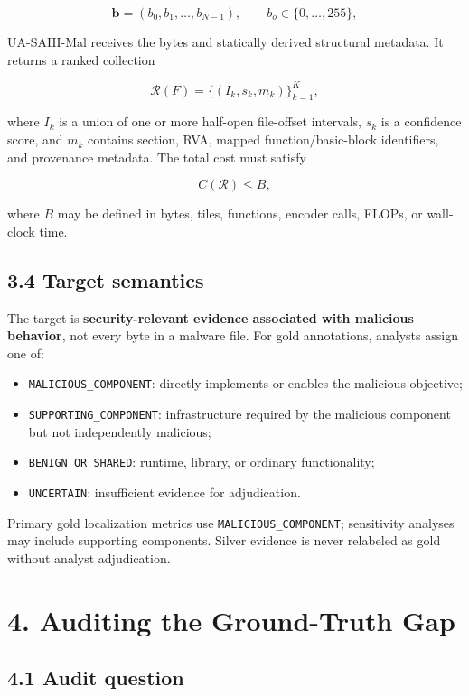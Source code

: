 \documentclass[
  10pt,
]{article}
\providecommand{\tightlist}{%
  \setlength{\itemsep}{0pt}\setlength{\parskip}{0pt}}
\begin{document}
\[
\mathbf{b} = (b_0, b_1, \ldots, b_{N-1}), \qquad b_o \in \{0,\ldots,255\},
\]

UA-SAHI-Mal receives the bytes and statically derived structural
metadata. It returns a ranked collection

\[
\mathcal{R}(F) = \{(I_k, s_k, m_k)\}_{k=1}^{K},
\]

where \(I_k\) is a union of one or more half-open file-offset intervals,
\(s_k\) is a confidence score, and \(m_k\) contains section, RVA, mapped
function/basic-block identifiers, and provenance metadata. The total
cost must satisfy

\[
C(\mathcal{R}) \le B,
\]

where \(B\) may be defined in bytes, tiles, functions, encoder calls,
FLOPs, or wall-clock time.

\subsection{3.4 Target semantics}\label{target-semantics}

The target is \textbf{security-relevant evidence associated with
malicious behavior}, not every byte in a malware file. For gold
annotations, analysts assign one of:

\begin{itemize}
\tightlist
\item
  \texttt{MALICIOUS\_COMPONENT}: directly implements or enables the
  malicious objective;
\item
  \texttt{SUPPORTING\_COMPONENT}: infrastructure required by the
  malicious component but not independently malicious;
\item
  \texttt{BENIGN\_OR\_SHARED}: runtime, library, or ordinary
  functionality;
\item
  \texttt{UNCERTAIN}: insufficient evidence for adjudication.
\end{itemize}

Primary gold localization metrics use \texttt{MALICIOUS\_COMPONENT};
sensitivity analyses may include supporting components. Silver evidence
is never relabeled as gold without analyst adjudication.

\section{4. Auditing the Ground-Truth
Gap}\label{auditing-the-ground-truth-gap}

\subsection{4.1 Audit question}\label{audit-question}
\end{document}
